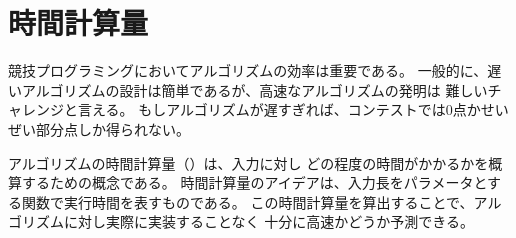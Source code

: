 \begin{comment}
\chapter{Time complexity}
\end{comment}
\chapter{時間計算量}


\begin{comment}
The efficiency of algorithms is important in competitive programming.
Usually, it is easy to design an algorithm
that solves the problem slowly,
but the real challenge is to invent a
fast algorithm.
If the algorithm is too slow, it will get only
partial points or no points at all.

The \key{time complexity} of an algorithm
estimates how much time the algorithm will use
for some input.
The idea is to represent the efficiency
as a function whose parameter is the size of the input.
By calculating the time complexity,
we can find out whether the algorithm is fast enough
without implementing it.
\end{comment}

競技プログラミングにおいてアルゴリズムの効率は重要である。
一般的に、遅いアルゴリズムの設計は簡単であるが、高速なアルゴリズムの発明は
難しいチャレンジと言える。
もしアルゴリズムが遅すぎれば、コンテストでは0点かせいぜい部分点しか得られない。

アルゴリズムの時間計算量（）は、入力に対し
どの程度の時間がかかるかを概算するための概念である。
時間計算量のアイデアは、入力長をパラメータとする関数で実行時間を表すものである。
この時間計算量を算出することで、アルゴリズムに対し実際に実装することなく
十分に高速かどうか予測できる。


\begin{comment}
\section{Calculation rules}

The time complexity of an algorithm
is denoted $O(\cdots)$
where the three dots represent some
function.
Usually, the variable $n$ denotes
the input size.
For example, if the input is an array of numbers,
$n$ will be the size of the array,
and if the input is a string,
$n$ will be the length of the string.
\end{comment}

